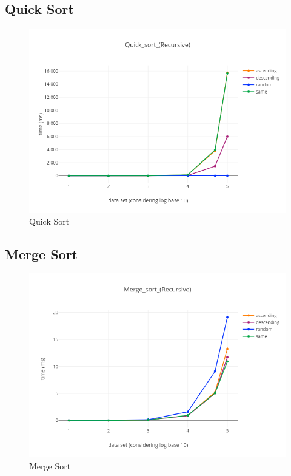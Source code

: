 \documentclass[paper=letter, fontsize=12pt]{article}
\begin{document}
\subsection{Quick Sort}
\begin{figure}[H]
	\centering
	\includegraphics[scale=0.75]{../analysis/Quick_sort_(Recursive).png}
	\caption{Quick Sort}
\end{figure}

\subsection{Merge Sort}
\begin{figure}[H]
	\centering
	\includegraphics[scale=0.75]{../analysis/Merge_sort_(Recursive).png}
	\caption{Merge Sort}
\end{figure}
\end{document}
